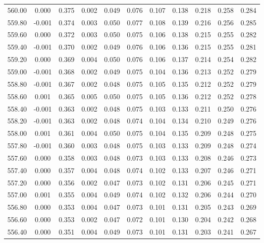 \begin{longtable}{cccccccccc}
    560.00 &  0.000 &  0.375 &  0.002 &  0.049 &  0.076 &  0.107 &  0.138 &  0.218 &  0.258 &  0.284 \\
    559.80 & -0.001 &  0.374 &  0.003 &  0.050 &  0.077 &  0.108 &  0.139 &  0.216 &  0.256 &  0.285 \\
    559.60 &  0.000 &  0.372 &  0.003 &  0.050 &  0.075 &  0.106 &  0.138 &  0.215 &  0.255 &  0.282 \\
    559.40 & -0.001 &  0.370 &  0.002 &  0.049 &  0.076 &  0.106 &  0.136 &  0.215 &  0.255 &  0.281 \\
    559.20 &  0.000 &  0.369 &  0.004 &  0.050 &  0.076 &  0.106 &  0.137 &  0.214 &  0.254 &  0.282 \\
    559.00 & -0.001 &  0.368 &  0.002 &  0.049 &  0.075 &  0.104 &  0.136 &  0.213 &  0.252 &  0.279 \\
    558.80 & -0.001 &  0.367 &  0.002 &  0.048 &  0.075 &  0.105 &  0.135 &  0.212 &  0.252 &  0.279 \\
    558.60 &  0.001 &  0.365 &  0.005 &  0.050 &  0.075 &  0.105 &  0.136 &  0.212 &  0.252 &  0.278 \\
    558.40 & -0.001 &  0.363 &  0.002 &  0.048 &  0.075 &  0.103 &  0.133 &  0.211 &  0.250 &  0.276 \\
    558.20 & -0.001 &  0.363 &  0.002 &  0.048 &  0.074 &  0.104 &  0.134 &  0.210 &  0.249 &  0.276 \\
    558.00 &  0.001 &  0.361 &  0.004 &  0.050 &  0.075 &  0.104 &  0.135 &  0.209 &  0.248 &  0.275 \\
    557.80 & -0.001 &  0.360 &  0.003 &  0.048 &  0.075 &  0.103 &  0.133 &  0.209 &  0.248 &  0.274 \\
    557.60 &  0.000 &  0.358 &  0.003 &  0.048 &  0.073 &  0.103 &  0.133 &  0.208 &  0.246 &  0.273 \\
    557.40 &  0.000 &  0.357 &  0.004 &  0.048 &  0.074 &  0.102 &  0.133 &  0.207 &  0.246 &  0.271 \\
    557.20 &  0.000 &  0.356 &  0.002 &  0.047 &  0.073 &  0.102 &  0.131 &  0.206 &  0.245 &  0.271 \\
    557.00 &  0.001 &  0.355 &  0.004 &  0.049 &  0.074 &  0.102 &  0.132 &  0.206 &  0.244 &  0.270 \\
    556.80 &  0.000 &  0.353 &  0.004 &  0.047 &  0.073 &  0.101 &  0.131 &  0.205 &  0.243 &  0.269 \\
    556.60 &  0.000 &  0.353 &  0.002 &  0.047 &  0.072 &  0.101 &  0.130 &  0.204 &  0.242 &  0.268 \\
    556.40 &  0.000 &  0.351 &  0.004 &  0.049 &  0.073 &  0.101 &  0.131 &  0.203 &  0.241 &  0.267 \\

\end{longtable}
